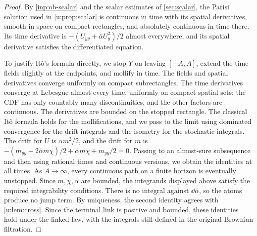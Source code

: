 \begin{proof}
By \cref{inp:ob-scalar} and the scalar estimates of \cref{sec:scalar}, the Parisi solution used in \cref{u:prop:scalar} is continuous in time with its spatial derivatives, smooth in space on compact rectangles, and absolutely continuous in time there. Its time derivative is $-(U_{yy}+\bar\alpha U_y^2)/2$ almost everywhere, and its spatial derivative satisfies the differentiated equation.

To justify It\^o's formula directly, we stop $Y$ on leaving $[-A,A]$, extend the time fields slightly at the endpoints, and mollify in time. The fields and spatial derivatives converge uniformly on compact subrectangles. The time derivatives converge at Lebesgue-almost-every time, uniformly on compact spatial sets: the CDF has only countably many discontinuities, and the other factors are continuous. The derivatives are bounded on the stopped rectangle. The classical It\^o formula \cite[Theorem~3.3.6]{karatzas-shreve-1991} holds for the mollifications, and we pass to the limit using dominated convergence for the drift integrals and the isometry for the stochastic integrals. The drift for $U$ is $\bar\alpha m^2/2$, and the drift for $m$ is $-(m_{yy}+2\bar\alpha m\chi)/2+\bar\alpha m\chi+m_{yy}/2=0$.
Passing to an almost-sure subsequence and then using rational times and continuous versions, we obtain the identities at all times. As $A\to\infty$, every continuous path on a finite horizon is eventually unstopped. Since $m,\chi,\bar\alpha$ are bounded, the integrands displayed above satisfy the required integrability conditions. There is no integral against $\dd\bar\alpha$, so the atoms produce no jump term. By uniqueness, the second identity agrees with \cref{u:lem:cross}. Since the terminal link is positive and bounded, these identities hold under the linked law, with the integrals still defined in the original Brownian filtration.
\end{proof}

